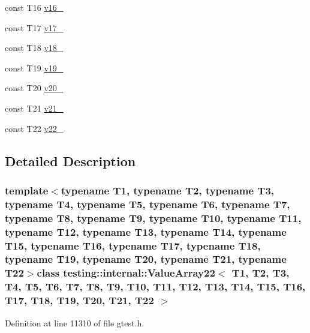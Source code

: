 \begin{DoxyCompactItemize}
\item 
const \-T16 \hyperlink{classtesting_1_1internal_1_1ValueArray22_a8b2b80d31925c1583c3e694d2bf235c5}{v16\-\_\-}
\item 
const \-T17 \hyperlink{classtesting_1_1internal_1_1ValueArray22_a9f59ea9e6f3642f77227dd1f7882d649}{v17\-\_\-}
\item 
const \-T18 \hyperlink{classtesting_1_1internal_1_1ValueArray22_ad07972ee98135c8deb090fc891a04e3e}{v18\-\_\-}
\item 
const \-T19 \hyperlink{classtesting_1_1internal_1_1ValueArray22_a3ad77b5b43c14332dabc9d47c8907e7f}{v19\-\_\-}
\item 
const \-T20 \hyperlink{classtesting_1_1internal_1_1ValueArray22_adb43992f7b5f5f07e0187003b8c9c872}{v20\-\_\-}
\item 
const \-T21 \hyperlink{classtesting_1_1internal_1_1ValueArray22_a80089b2eaa99efb5d3559378fbdac426}{v21\-\_\-}
\item 
const \-T22 \hyperlink{classtesting_1_1internal_1_1ValueArray22_aeec4c711a4f7cf166e6a2646aa7d0bc7}{v22\-\_\-}
\end{DoxyCompactItemize}


\subsection{\-Detailed \-Description}
\subsubsection*{template$<$typename T1, typename T2, typename T3, typename T4, typename T5, typename T6, typename T7, typename T8, typename T9, typename T10, typename T11, typename T12, typename T13, typename T14, typename T15, typename T16, typename T17, typename T18, typename T19, typename T20, typename T21, typename T22$>$class testing\-::internal\-::\-Value\-Array22$<$ T1, T2, T3, T4, T5, T6, T7, T8, T9, T10, T11, T12, T13, T14, T15, T16, T17, T18, T19, T20, T21, T22 $>$}



\-Definition at line 11310 of file gtest.\-h.



